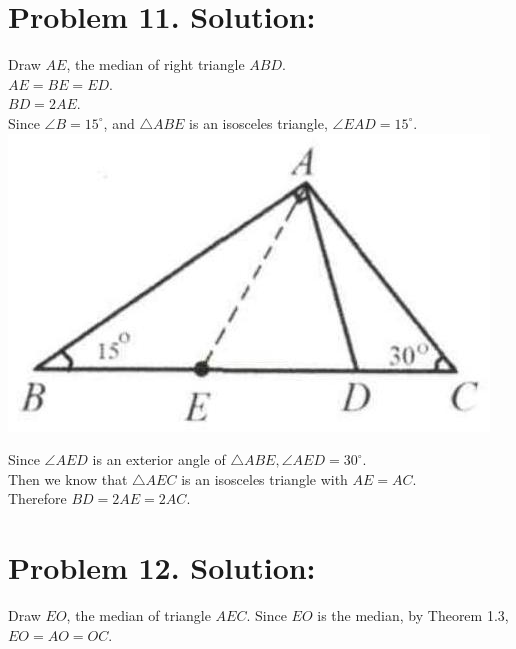\documentclass[10pt]{article}
\begin{document}
\section*{Problem 11. Solution:}
Draw \(A E\), the median of right triangle \(A B D\).\\
\(A E=B E=E D\).\\
\(B D=2 A E\).\\
Since \(\angle B=15^{\circ}\), and \(\triangle A B E\) is an isosceles triangle, \(\angle E A D=15^{\circ}\).\\
\includegraphics[max width=\textwidth, center]{2025_04_17_97bc1f7e44d93c271a88g-021}

Since \(\angle A E D\) is an exterior angle of \(\triangle A B E, \angle A E D=30^{\circ}\).\\
Then we know that \(\triangle A E C\) is an isosceles triangle with \(A E=A C\).\\
Therefore \(B D=2 A E=2 A C\).

\section*{Problem 12. Solution:}
Draw \(E O\), the median of triangle \(A E C\). Since \(E O\) is the median, by Theorem 1.3, \(E O=A O=O C\).
\end{document}

